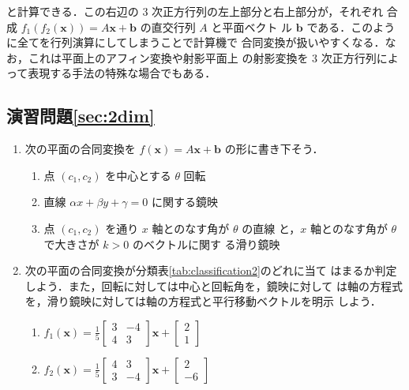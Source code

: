 \documentclass[11pt, uplatex, dvipdfmx, titlepage]{jsarticle}
\newcommand{\ds}{\displaystyle}
\theoremstyle{definition}
\begin{document}
と計算できる．この右辺の $3$ 次正方行列の左上部分と右上部分が，それぞれ
合成 $f_1(f_2(\bm{x}))=A\bm{x} + \bm{b}$ の直交行列 $A$ と平面ベクト
ル $\bm{b}$ である．このように全てを行列演算にしてしまうことで計算機で
合同変換が扱いやすくなる．なお，これは平面上のアフィン変換や射影平面上
の射影変換を $3$ 次正方行列によって表現する手法の特殊な場合でもある．

\newpage

\subsection*{演習問題\ref{sec:2dim}}

\begin{enumerate}
  \setlength{\itemsep}{1zh}

\item 次の平面の合同変換を $f(\bm{x}) = A\bm{x} + \bm{b}$
  の形に書き下そう．
  \begin{enumerate}[(1)]
  \item 点 $(c_1, c_2)$ を中心とする $\theta$ 回転 
  \item 直線 $\alpha x + \beta y + \gamma =0$ に関する鏡映
  \item 点 $(c_1, c_2)$ を通り $x$ 軸とのなす角が $\theta$ の直線
    と，$x$ 軸とのなす角が $\theta$ で大きさが $k >0$ のベクトルに関す
    る滑り鏡映
  \end{enumerate}

\item 次の平面の合同変換が分類表\ref{tab:classification2}のどれに当て
  はまるか判定しよう．また，回転に対しては中心と回転角を，鏡映に対して
  は軸の方程式を，滑り鏡映に対しては軸の方程式と平行移動ベクトルを明示
  しよう．

  \vspace{1zh}

  \begin{enumerate}[(1)]
    \setlength{\itemsep}{1zh}

  \item $\ds f_1(\bm{x}) = \frac{1}{5}\left[
      \begin{array}{rr}
        3 & -4\\
        4 & 3
      \end{array}
    \right]\bm{x}+\left[
      \begin{array}{r}
        2\\
        1
      \end{array}
    \right]$

  \item $\ds f_2(\bm{x})=\frac{1}{5} \left[
      \begin{array}{rr}
        4 & 3\\
        3 & -4
      \end{array}
    \right]\bm{x} + \left[
      \begin{array}{r}
        2\\
        -6
      \end{array}
    \right]$
    

\end{enumerate}
\end{enumerate}
\end{document}
